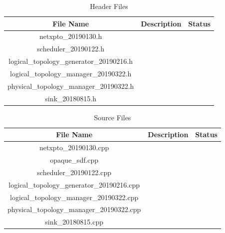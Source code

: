 \begin{table}[H]
	\centering
	\begin{tabular}{| c | c | c |}
		\hline
		\textbf{File Name}                        & \textbf{Description} & Status\\ \hline
		netxpto\_20190130.h                       &                      &       \\ \hline
		scheduler\_20190122.h                     &                      &       \\ \hline
		logical\_topology\_generator\_20190216.h  &                      &       \\ \hline
		logical\_topology\_manager\_20190322.h    &                      &       \\ \hline
		physical\_topology\_manager\_20190322.h   &                      &       \\ \hline
		sink\_20180815.h                          &                      &       \\ \hline
	\end{tabular}
	\caption{Header Files}
	\label{header_files}
\end{table}

\begin{table}[H]
	\centering
	\begin{tabular}{| c | c | c |}
		\hline
		\textbf{File Name}                          & \textbf{Description} & Status\\ \hline
		netxpto\_20190130.cpp                       &                      &       \\ \hline
		opaque\_sdf.cpp                             &                      &       \\ \hline
		scheduler\_20190122.cpp                     &                      &       \\ \hline
		logical\_topology\_generator\_20190216.cpp  &                      &       \\ \hline
		logical\_topology\_manager\_20190322.cpp    &                      &       \\ \hline
		physical\_topology\_manager\_20190322.cpp   &                      &       \\ \hline
		sink\_20180815.cpp                          &                      &       \\ \hline
	\end{tabular}
	\caption{Source Files}
	\label{source_files}
\end{table}


